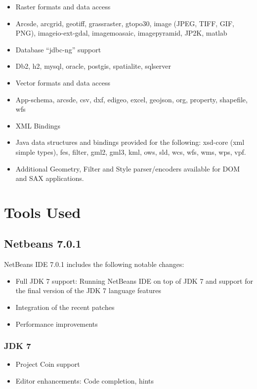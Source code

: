 \begin{itemize}
\item Raster formats and data access
\item Arcsde, arcgrid, geotiff, grassraster, gtopo30, image (JPEG, TIFF, GIF, PNG), imageio-ext-gdal, imagemoasaic, imagepyramid, JP2K, matlab
\item Database “jdbc-ng” support
\item Db2, h2, mysql, oracle, postgis, spatialite, sqlserver
\item Vector formats and data access
\item App-schema, arcsde, csv, dxf, edigeo, excel, geojson, org, property, shapefile, wfs
\item XML Bindings
\item Java data structures and bindings provided for the following: xsd-core (xml simple types), fes, filter, gml2, gml3, kml, ows, sld, wcs, wfs, wms, wps, vpf.
\item Additional Geometry, Filter and Style parser/encoders available for DOM and SAX applications.
\end{itemize}

\section{Tools Used}

\subsection{Netbeans 7.0.1}
NetBeans IDE 7.0.1 includes the following notable changes:

\begin{itemize}
\item Full JDK 7 support: Running NetBeans IDE on top of JDK 7 and support for the final version of the JDK 7 language features
\item Integration of the recent patches
\item Performance improvements
\end{itemize}

\subsubsection{JDK 7}
\begin{itemize}
\item Project Coin support
\item Editor enhancements: Code completion, hints
\end{itemize}

